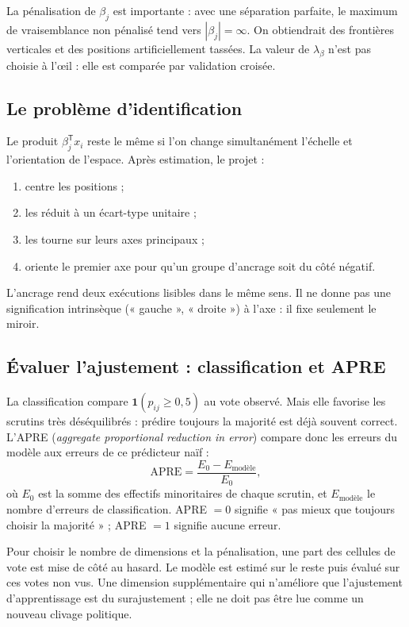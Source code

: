 \documentclass[11pt,a4paper]{article}
\newcommand{\ind}{\mathbf{1}}
\begin{document}
La pénalisation de $\beta_j$ est importante : avec une séparation parfaite,
le maximum de vraisemblance non pénalisé tend vers $|\beta_j|=\infty$. On
obtiendrait des frontières verticales et des positions artificiellement tassées.
La valeur de $\lambda_\beta$ n'est pas choisie à l'œil : elle est comparée par
validation croisée.

\subsection{Le problème d'identification}

Le produit $\beta_j^{\mathsf T}x_i$ reste le même si l'on change simultanément
l'échelle et l'orientation de l'espace. Après estimation, le projet :

\begin{enumerate}
  \item centre les positions ;
  \item les réduit à un écart-type unitaire ;
  \item les tourne sur leurs axes principaux ;
  \item oriente le premier axe pour qu'un groupe d'ancrage soit du côté négatif.
\end{enumerate}

L'ancrage rend deux exécutions lisibles dans le même sens. Il ne donne pas une
signification intrinsèque (« gauche », « droite ») à l'axe : il fixe seulement
le miroir.

\subsection{Évaluer l'ajustement : classification et APRE}

La classification compare $\ind(p_{ij}\geq0{,}5)$ au vote observé. Mais elle
favorise les scrutins très déséquilibrés : prédire toujours la majorité est déjà
souvent correct. L'APRE (\emph{aggregate proportional reduction in error})
compare donc les erreurs du modèle aux erreurs de ce prédicteur naïf :
\[
 \mathrm{APRE}=\frac{E_0-E_{\mathrm{modèle}}}{E_0},
\]
où $E_0$ est la somme des effectifs minoritaires de chaque scrutin, et
$E_{\mathrm{modèle}}$ le nombre d'erreurs de classification. APRE $=0$ signifie
« pas mieux que toujours choisir la majorité » ; APRE $=1$ signifie aucune erreur.

Pour choisir le nombre de dimensions et la pénalisation, une part des cellules
de vote est mise de côté au hasard. Le modèle est estimé sur le reste puis
évalué sur ces votes non vus. Une dimension supplémentaire qui n'améliore que
l'ajustement d'apprentissage est du surajustement ; elle ne doit pas être lue
comme un nouveau clivage politique.
\end{document}
